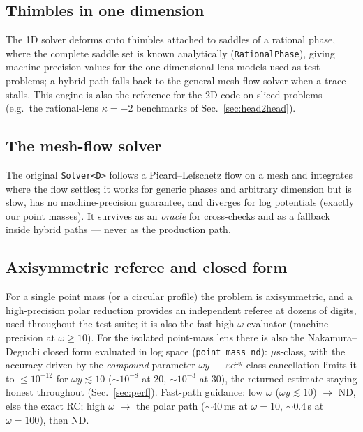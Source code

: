 \documentclass[11pt,a4paper]{article}
\begin{document}
\subsection{Thimbles in one dimension}
The 1D solver deforms onto thimbles attached to saddles of a rational
phase, where the complete saddle set is known analytically
(\texttt{RationalPhase}), giving machine-precision values for the
one-dimensional lens models used as test problems; a hybrid path falls back
to the general mesh-flow solver when a trace stalls.  This engine is also
the reference for the 2D code on sliced problems (e.g.\ the rational-lens
$\kappa=-2$ benchmarks of Sec.~\ref{sec:head2head}).

\subsection{The mesh-flow solver}
The original \texttt{Solver<D>} follows a Picard--Lefschetz flow on a mesh
and integrates where the flow settles; it works for generic phases and
arbitrary dimension but is slow, has no machine-precision guarantee, and
diverges for log potentials (exactly our point masses).  It survives as an
\emph{oracle} for cross-checks and as a fallback inside hybrid paths ---
never as the production path.

\subsection{Axisymmetric referee and closed form}
For a single point mass (or a circular profile) the problem is
axisymmetric, and a high-precision polar reduction provides an independent
referee at dozens of digits, used throughout the test suite; it is also the
fast high-$\omega$ evaluator (machine precision at $\omega \ge 10$).  For
the isolated point-mass lens there is also the Nakamura--Deguchi closed
form \cite{Nakamura1998,TakahashiNakamura2003} evaluated in log space
(\texttt{point\_mass\_nd}): $\mu$s-class, with the accuracy driven by the
\emph{compound} parameter $\omega y$ --- $\varepsilon e^{\omega y}$-class
cancellation limits it to $\le10^{-12}$ for $\omega y \lesssim 10$
($\sim10^{-8}$ at 20, $\sim10^{-3}$ at 30), the returned estimate staying
honest throughout (Sec.~\ref{sec:perf}).  Fast-path guidance: low $\omega$
($\omega y \lesssim 10$) $\to$ ND, else the exact RC; high $\omega$ $\to$
the polar path ($\sim$40\,ms at $\omega=10$, $\sim$0.4\,s at
$\omega=100$), then ND.
\end{document}
